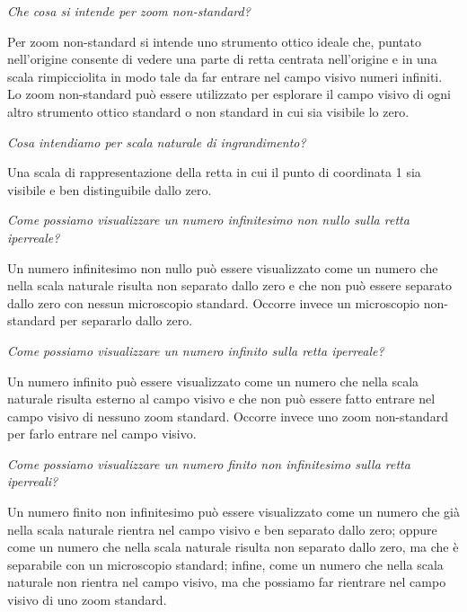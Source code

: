 \begin{esercizio}\label{ese:iper_036} 
\emph{Che cosa si intende per zoom non-standard?}

Per zoom non-standard si intende uno strumento ottico ideale che, puntato 
nell'origine consente di vedere una parte di retta centrata nell'origine e 
in una scala rimpicciolita in modo tale da far entrare nel campo visivo 
numeri infiniti. 
Lo zoom non-standard può essere utilizzato per esplorare il campo 
visivo di ogni altro strumento ottico standard o non standard in cui sia 
visibile lo zero.
\end{esercizio}

\begin{esercizio}\label{ese:iper_037} 
\emph{Cosa intendiamo per scala naturale di ingrandimento?}

Una scala di rappresentazione della retta in cui il punto di coordinata 1 
sia visibile e ben distinguibile dallo zero.
\end{esercizio}

\begin{esercizio}\label{ese:iper_038} 
\emph{Come possiamo visualizzare un numero infinitesimo non nullo sulla 
retta iperreale?}

Un numero infinitesimo non nullo può essere visualizzato come un numero che 
nella scala naturale risulta non separato dallo zero e che non può essere 
separato dallo zero con nessun microscopio standard. Occorre invece un 
microscopio non-standard per separarlo dallo zero.
\end{esercizio}

\begin{esercizio}\label{ese:iper_039} 
\emph{Come possiamo visualizzare un numero infinito sulla retta iperreale?}

Un numero infinito può essere visualizzato come un numero che nella scala 
naturale risulta esterno al campo visivo e che non può essere fatto entrare 
nel campo visivo di nessuno zoom standard. Occorre invece uno zoom 
non-standard per farlo entrare nel campo visivo.
\end{esercizio}

\begin{esercizio}\label{ese:iper_040} 
\emph{Come possiamo visualizzare un numero finito non infinitesimo sulla 
retta iperreali?}

Un numero finito non infinitesimo può essere visualizzato come un numero 
che già nella scala naturale rientra nel campo visivo e ben separato dallo 
zero; 
oppure come un numero che nella scala naturale risulta non separato dallo 
zero, ma che è separabile con un microscopio standard; 
infine, come un numero che nella scala naturale non rientra nel campo 
visivo, ma che possiamo far rientrare nel campo visivo di uno zoom standard.
\end{esercizio}


